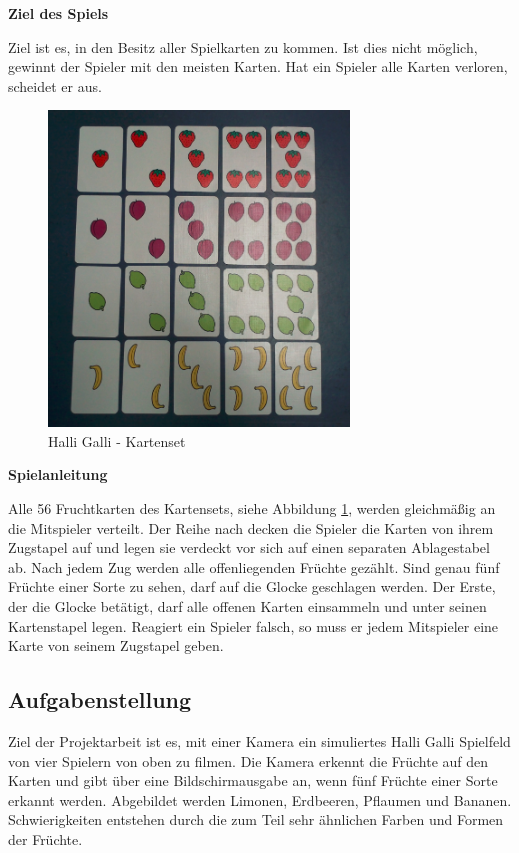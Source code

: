 \textbf{Ziel des Spiels}

Ziel ist es, in den Besitz aller Spielkarten zu kommen. Ist dies nicht möglich, gewinnt der Spieler mit den meisten Karten. Hat ein Spieler alle Karten verloren, scheidet er aus.



\begin{figure}[H]
    \centering
    \includegraphics[width=8cm]{Abbildungen/Kartenset}
    \caption[Cocer]{Halli Galli - Kartenset}
    \label{fig:Kartenset}
\end{figure}
\textbf{Spielanleitung}

Alle 56 Fruchtkarten des Kartensets, siehe Abbildung \ref{fig:Kartenset}, werden gleichmäßig an die Mitspieler verteilt. Der Reihe nach decken die Spieler die Karten von ihrem Zugstapel auf und legen sie verdeckt vor sich auf einen separaten Ablagestabel ab. Nach jedem Zug werden alle offenliegenden  Früchte gezählt. Sind genau fünf Früchte einer Sorte zu sehen, darf auf die Glocke geschlagen werden. Der Erste, der die Glocke betätigt, darf alle offenen Karten einsammeln und unter seinen Kartenstapel legen. Reagiert ein Spieler falsch, so muss er jedem Mitspieler eine Karte von seinem Zugstapel geben.

\subsection{Aufgabenstellung}
Ziel der Projektarbeit ist es, mit einer Kamera ein simuliertes Halli Galli Spielfeld von vier Spielern von oben zu filmen. Die Kamera erkennt die Früchte auf den Karten und gibt über eine Bildschirmausgabe an, wenn fünf Früchte einer Sorte erkannt werden. Abgebildet werden Limonen, Erdbeeren, Pflaumen und Bananen. Schwierigkeiten entstehen durch die zum Teil sehr ähnlichen Farben und Formen der Früchte.

